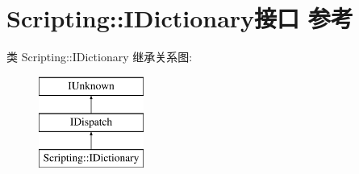 \hypertarget{interface_scripting_1_1_i_dictionary}{}\section{Scripting\+:\+:I\+Dictionary接口 参考}
\label{interface_scripting_1_1_i_dictionary}
类 Scripting\+:\+:I\+Dictionary 继承关系图\+:\begin{figure}[H]
\begin{center}
\leavevmode
\includegraphics[height=3.000000cm]{interface_scripting_1_1_i_dictionary}
\end{center}
\end{figure}
